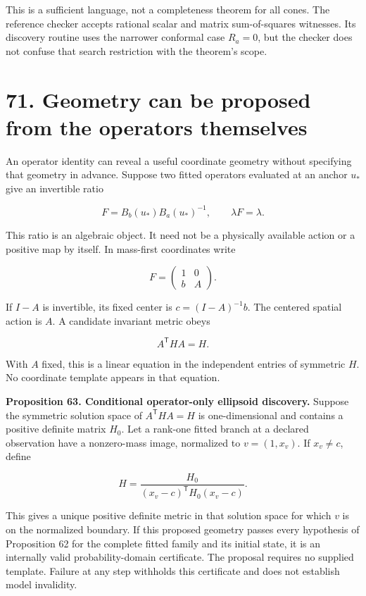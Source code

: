 \documentclass[11pt,letterpaper]{article}
\begin{document}
This is a sufficient language, not a completeness theorem for all cones.
The reference checker accepts rational scalar and matrix sum-of-squares
witnesses. Its discovery routine uses the narrower conformal case
\(R_a=0\), but the checker does not confuse that search restriction with
the theorem's scope.

\section{71. Geometry can be proposed from the operators
themselves}\label{geometry-can-be-proposed-from-the-operators-themselves}

An operator identity can reveal a useful coordinate geometry without
specifying that geometry in advance. Suppose two fitted operators
evaluated at an anchor \(u_*\) give an invertible ratio

\[
F=B_b(u_*)B_a(u_*)^{-1},\qquad \lambda F=\lambda.
\]

This ratio is an algebraic object. It need not be a physically available
action or a positive map by itself. In mass-first coordinates write

\[
F=\begin{pmatrix}1&0\\b&A\end{pmatrix}.
\]

If \(I-A\) is invertible, its fixed center is \(c=(I-A)^{-1}b\). The
centered spatial action is \(A\). A candidate invariant metric obeys

\[
A^{\mathsf T}HA=H.
\]

With \(A\) fixed, this is a linear equation in the independent entries
of symmetric \(H\). No coordinate template appears in that equation.

\textbf{Proposition 63. Conditional operator-only ellipsoid discovery.}
Suppose the symmetric solution space of \(A^{\mathsf T}HA=H\) is
one-dimensional and contains a positive definite matrix \(H_0\). Let a
rank-one fitted branch at a declared observation have a nonzero-mass
image, normalized to \(v=(1,x_v)\). If \(x_v\neq c\), define

\[
H=\frac{H_0}{(x_v-c)^{\mathsf T}H_0(x_v-c)}.
\]

This gives a unique positive definite metric in that solution space for
which \(v\) is on the normalized boundary. If this proposed geometry
passes every hypothesis of Proposition 62 for the complete fitted family
and its initial state, it is an internally valid probability-domain
certificate. The proposal requires no supplied template. Failure at any
step withholds this certificate and does not establish model invalidity.
\end{document}
